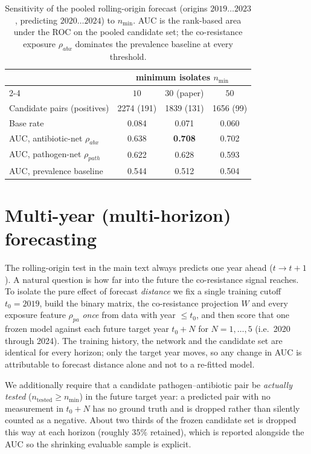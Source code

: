 \begin{table}[htbp]
\centering
\caption{Sensitivity of the pooled rolling-origin forecast (origins $2019\ldots2023$, predicting
$2020\ldots2024$) to $n_{\min}$. AUC is the rank-based area under the ROC on the pooled candidate set;
the co-resistance exposure $\rho_{abx}$ dominates the prevalence baseline at every threshold.}
\label{tab:minN-forecast}
\small
\begin{tabular}{l ccc}
\toprule
 & \multicolumn{3}{c}{minimum isolates $n_{\min}$} \\
\cmidrule(lr){2-4}
 & $10$ & $30$ (paper) & $50$ \\
\midrule
Candidate pairs (positives)               & 2274 (191) & 1839 (131) & 1656 (99) \\
Base rate                                 & 0.084 & 0.071 & 0.060 \\
\addlinespace[2pt]
AUC, antibiotic-net $\rho_{abx}$          & 0.638 & \textbf{0.708} & 0.702 \\
AUC, pathogen-net $\rho_{path}$           & 0.622 & 0.628 & 0.593 \\
AUC, prevalence baseline                  & 0.544 & 0.512 & 0.504 \\
\bottomrule
\end{tabular}
\end{table}

\section{Multi-year (multi-horizon) forecasting}
\label{app:horizon}
The rolling-origin test in the main text always predicts one year ahead ($t\to t+1$). A natural
question is how far into the future the co-resistance signal reaches. To isolate the pure effect of
forecast \emph{distance} we fix a single training cutoff $t_0=2019$, build the binary matrix, the
co-resistance projection $W$ and every exposure feature $\rho_{pa}$ \emph{once} from data with
year $\le t_0$, and then score that one frozen model against each future target year $t_0+N$ for
$N=1,\ldots,5$ (i.e.\ 2020 through 2024). The training history, the network and the candidate set are
identical for every horizon; only the target year moves, so any change in AUC is attributable to
forecast distance alone and not to a re-fitted model.

We additionally require that a candidate pathogen--antibiotic pair be \emph{actually tested}
($n_{\text{tested}}\ge n_{\min}$) in the future target year: a predicted pair with no measurement in
$t_0+N$ has no ground truth and is dropped rather than silently counted as a negative. About two
thirds of the frozen candidate set is dropped this way at each horizon (roughly $35\%$ retained),
which is reported alongside the AUC so the shrinking evaluable sample is explicit.

